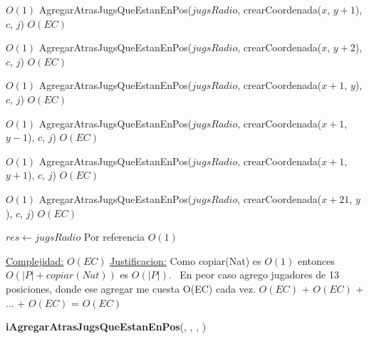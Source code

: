 \begin{Algoritmos}
\begin{algorithmic}[1]
         \Comment $O(1)$
        \State AgregarAtrasJugsQueEstanEnPos($jugsRadio$, crearCoordenada($x$, $y+1$), $c$, $j$)    \Comment $O(EC)$
    \EndIf


             \Comment $O(1)$
            \State AgregarAtrasJugsQueEstanEnPos($jugsRadio$, crearCoordenada($x$, $y+2$), $c$, $j$)    \Comment $O(EC)$
        \EndIf


    \EndIf

\EndIf

         \Comment $O(1)$
        \State AgregarAtrasJugsQueEstanEnPos($jugsRadio$, crearCoordenada($x+1$, $y$), $c$, $j$)    \Comment $O(EC)$
    \EndIf

             \Comment $O(1)$
            \State AgregarAtrasJugsQueEstanEnPos($jugsRadio$, crearCoordenada($x+1$, $y-1$), $c$, $j$)    \Comment $O(EC)$
        \EndIf
    \EndIf

             \Comment $O(1)$
            \State AgregarAtrasJugsQueEstanEnPos($jugsRadio$, crearCoordenada($x+1$, $y+1$), $c$, $j$)    \Comment $O(EC)$
        \EndIf

    \EndIf
\EndIf

         \Comment $O(1)$
        \State AgregarAtrasJugsQueEstanEnPos($jugsRadio$, crearCoordenada($x+21$, $y$), $c$, $j$)    \Comment $O(EC)$
    \EndIf
\EndIf

\State $res \gets jugsRadio$ \Comment Por referencia $O(1)$

\medskip
\State \underline{Complejidad:} $O(EC)$ %
\State \underline{Justificacion:} Como copiar(Nat) es $O(1)$ entonces $O(|P| + copiar(Nat))$ es $O(|P|)$. \ En peor caso agrego jugadores de 13 posiciones, donde ese agregar me cuesta O(EC) cada vez. $O(EC)$ + $O(EC)$ + ... + $O(EC)$ = $O(EC)$ 

\end{algorithmic}


  



\begin{algorithm}[H]
{\textbf{iAgregarAtrasJugsQueEstanEnPos}(, , , )}
\begin{algorithmic}[1]


\end{algorithmic}
\end{algorithm}
\end{Algoritmos}
